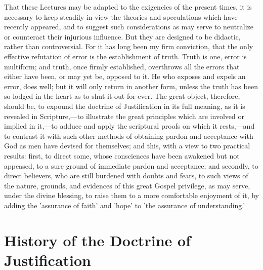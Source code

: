 \documentclass[
]{book}
\begin{document}
That these Lectures may be adapted to the exigencies of the present times, it is necessary to keep steadily in view the theories and speculations which have recently appeared, and to suggest such considerations as may serve to neutralize or counteract their injurious influence. But they are designed to be didactic, rather than controversial. For it has long been my firm conviction, that the only effective refutation of error is the establishment of truth. Truth is one, error is multiform; and truth, once firmly established, overthrows all the errors that either have been, or may yet be, opposed to it. He who exposes and expels an error, does well; but it will only return in another form, unless the truth has been so lodged in the heart as to shut it out for ever. The great object, therefore, should be, to expound the doctrine of Justification in its full meaning, as it is revealed in Scripture,---to illustrate the great principles which are involved or implied in it,---to adduce and apply the scriptural proofs on which it rests,---and to contrast it with such other methods of obtaining pardon and acceptance with God as men have devised for themselves; and this, with a view to two practical results: first, to direct some, whose consciences have been awakened but not appeased, to a sure ground of immediate pardon and acceptance; and secondly, to direct believers, who are still burdened with doubts and fears, to such views of the nature, grounds, and evidences of this great Gospel privilege, as may serve, under the divine blessing, to raise them to a more comfortable enjoyment of it, by adding the 'assurance of faith' and 'hope' to 'the assurance of understanding.'

\hypertarget{history-of-the-doctrine-of-justification}{%
\chapter{History of the Doctrine of Justification}\label{history-of-the-doctrine-of-justification}}
\end{document}
